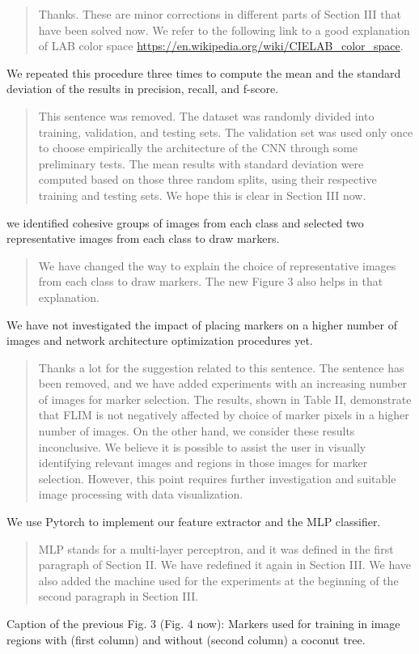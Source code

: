 \documentclass[a4paper,12pt]{article}
\newcommand{\rwr}[1]{\par \medskip \noindent {\bf Reviewer #1: }}
\newcommand{\ans}{\smallskip\begin{quote}  \noindent }
\newcommand{\eans}{\end{quote}}
\begin{document}
\ans Thanks. These are minor corrections in different parts of Section III that have been solved now. We refer to the following link to a good explanation of LAB color space \url{https://en.wikipedia.org/wiki/CIELAB_color_space}. 
\eans

\rwr{1} We repeated this procedure three times to compute the mean and the standard deviation of the results in precision, recall, and f-score. 

\ans 
This sentence was removed. The dataset was randomly divided into training, validation, and testing sets. The validation set was used only once to choose empirically the architecture of the CNN through some preliminary tests. The mean results with standard deviation were computed based on those three random splits, using their respective training and testing sets. We hope this is clear in Section III now. 
\eans

\rwr{1} we identified cohesive groups of images from each class and selected two representative images from each class to draw markers.  

\ans We have changed the way to explain the choice of representative images from each class to draw markers. The new Figure 3 also helps in that explanation. \eans

\rwr{1} We have not investigated the impact of placing markers on a higher number of images and network architecture optimization procedures yet.

\ans Thanks a lot for the suggestion related to this sentence. The sentence has been removed, and we have added experiments with an increasing number of images for marker selection. The results, shown in Table II, demonstrate that FLIM is not negatively affected by choice of marker pixels in a higher number of images. On the other hand, we consider these results inconclusive. We believe it is possible to assist the user in visually identifying relevant images and regions in those images for marker selection. However, this point requires further investigation and suitable image processing with data visualization.   \eans

\rwr{1} We use Pytorch to implement our feature extractor and the MLP classifier.

\ans MLP stands for a multi-layer perceptron, and it was defined in the first paragraph of Section II. We have redefined it again in Section III. We have also added the machine used for the experiments at the beginning of the second paragraph in Section III. \eans

\rwr{1} Caption of the previous Fig. 3 (Fig. 4 now): Markers used for training in image regions with (first column) and without (second column) a coconut tree.
\end{document}
